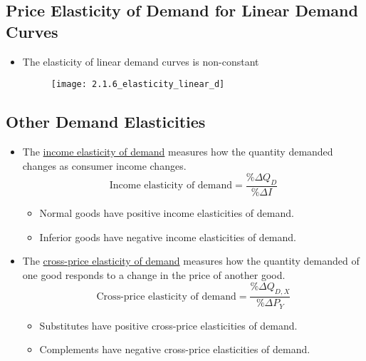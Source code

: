 \newpage



\subsection{Price Elasticity of Demand for Linear Demand Curves}

\begin{itemize}

\item The elasticity of linear demand curves is non-constant

\begin{figure}[h]
\centering
\texttt{[image: 2.1.6\_elasticity\_linear\_d]}
\end{figure}

\end{itemize}



\subsection{Other Demand Elasticities}

\begin{itemize}

\item The \underline{income elasticity of demand} measures how the quantity demanded changes as consumer income changes.
	\[\text{Income elasticity of demand} = \frac{\% \Delta Q_D}{\% \Delta I} \]
	
	\begin{itemize}
	
	\item Normal goods have positive income elasticities of demand.
	
	\item Inferior goods have negative income elasticities of demand.
	
	\end{itemize}
	
\item The \underline{cross-price elasticity of demand} measures how the quantity demanded of one good responds to a change in the price of another good.
	\[ \text{Cross-price elasticity of demand} = \frac{\% \Delta Q_{D,X}}{\% \Delta P_Y} \]
	
	\begin{itemize}
	
	\item Substitutes have positive cross-price elasticities of demand.
	
	\item Complements have negative cross-price elasticities of demand.
	
	\end{itemize}
	
\end{itemize}
